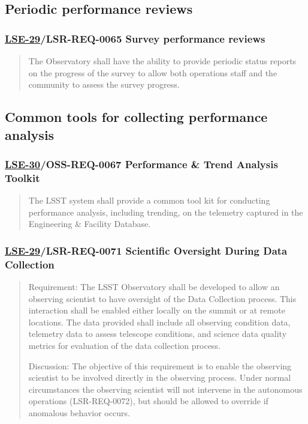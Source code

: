 \subsection{Periodic performance reviews}
\label{sec:org640357c}
\subsubsection{\href{https://ls.st/lse-29}{LSE-29}/LSR-REQ-0065 Survey performance reviews}
\label{sec:orga14519b}
\begin{quote}
The Observatory shall have the ability to provide periodic status
reports on the progress of the survey to allow both operations staff
and the community to assess the survey progress.
\end{quote}
\subsection{Common tools for collecting performance analysis}
\label{sec:orgeb21da6}
\subsubsection{\href{https://ls.st/lse-30}{LSE-30}/OSS-REQ-0067 Performance \& Trend Analysis Toolkit}
\label{sec:org7029949}
\begin{quote}
The LSST system shall provide a common tool kit for conducting performance analysis, including trending, on the telemetry captured in the Engineering \& Facility Database.
\end{quote}
\subsubsection{\href{https://ls.st/lse-29}{LSE-29}/LSR-REQ-0071 Scientific Oversight During Data Collection}
\label{sec:org82f28ad}
\begin{quote}
Requirement: The LSST Observatory shall be developed to allow an
observing scientist to have oversight of the Data Collection
process. This interaction shall be enabled either locally on the
summit or at remote locations. The data provided shall include all
observing condition data, telemetry data to assess telescope
conditions, and science data quality metrics for evaluation of the
data collection process.

Discussion: The objective of this requirement is to enable the
observing scientist to be involved directly in the observing
process. Under normal circumstances the observing scientist will not
intervene in the autonomous operations (LSR-REQ-0072), but should be
allowed to override if anomalous behavior occurs.
\end{quote}
